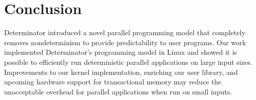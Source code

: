 
\section{Conclusion}

Determinator introduced a novel parallel programming model that completely
removes nondeterminism to provide predictability to user programs. Our work
implemented Determinator's programming model in Linux and showed it is possible
to efficiently run deterministic parallel applications on large input sizes.
Improvements to our kernel implementation, enriching our user library, and
upcoming hardware support for transactional memory may reduce the unacceptable
overhead for parallel applications when run on small inputs. 

\endinput

